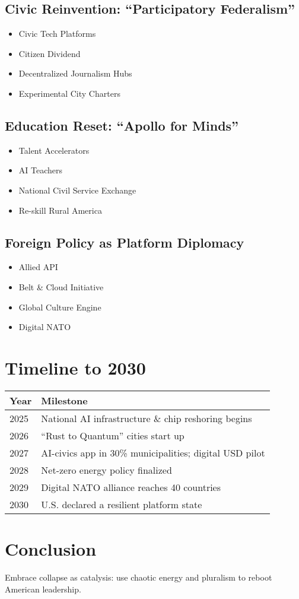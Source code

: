 \documentclass[11pt]{article}
\begin{document}
\subsection{Civic Reinvention: “Participatory Federalism”}
\begin{itemize}
    \item Civic Tech Platforms
    \item Citizen Dividend
    \item Decentralized Journalism Hubs
    \item Experimental City Charters
\end{itemize}

\subsection{Education Reset: “Apollo for Minds”}
\begin{itemize}
    \item Talent Accelerators
    \item AI Teachers
    \item National Civil Service Exchange
    \item Re-skill Rural America
\end{itemize}

\subsection{Foreign Policy as Platform Diplomacy}
\begin{itemize}
    \item Allied API
    \item Belt \& Cloud Initiative
    \item Global Culture Engine
    \item Digital NATO
\end{itemize}

\section{Timeline to 2030}
\begin{tabular}{ll}
\hline
Year & Milestone \\
\hline
2025 & National AI infrastructure \& chip reshoring begins \\
2026 & “Rust to Quantum” cities start up \\
2027 & AI-civics app in 30\% municipalities; digital USD pilot \\
2028 & Net-zero energy policy finalized \\
2029 & Digital NATO alliance reaches 40 countries \\
2030 & U.S. declared a resilient platform state \\
\hline
\end{tabular}

\section{Conclusion}
Embrace collapse as catalysis: use chaotic energy and pluralism to reboot American leadership.



\end{document}
